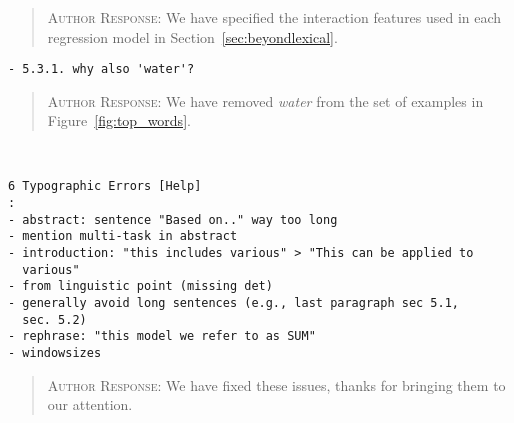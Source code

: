 \begin{quote}
\textsc{Author Response:}  We have specified the interaction features used in each regression model in Section~\ref{sec:beyondlexical}.
\end{quote}
\begin{verbatim}
- 5.3.1. why also 'water'?
\end{verbatim}  
\begin{quote}
\textsc{Author Response:}  We have removed {\it water} from the set of examples 
in Figure~\ref{fig:top_words}.
\end{quote}
\begin{verbatim}


6 Typographic Errors [Help]
: 
- abstract: sentence "Based on.." way too long
- mention multi-task in abstract
- introduction: "this includes various" > "This can be applied to
  various"
- from linguistic point (missing det)
- generally avoid long sentences (e.g., last paragraph sec 5.1,
  sec. 5.2)
- rephrase: "this model we refer to as SUM"
- windowsizes
\end{verbatim}  
\begin{quote}
\textsc{Author Response:}  We have fixed these issues, thanks for bringing them to our attention.
\end{quote}
